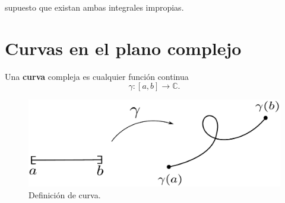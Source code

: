 supuesto que existan ambas integrales impropias.

\section{Curvas en el plano complejo}

\begin{defi}
Una \textbf{curva} compleja es cualquier función continua
$$\gamma: [a,b] \longrightarrow \mathbb{C}.$$
\end{defi}

\begin{figure}[H]
    \centering
    \includegraphics[scale = 0.5]{Figuras/Curva1.pdf}
    \caption{Definición de curva.}
    \label{fig:Curva1}
\end{figure}

